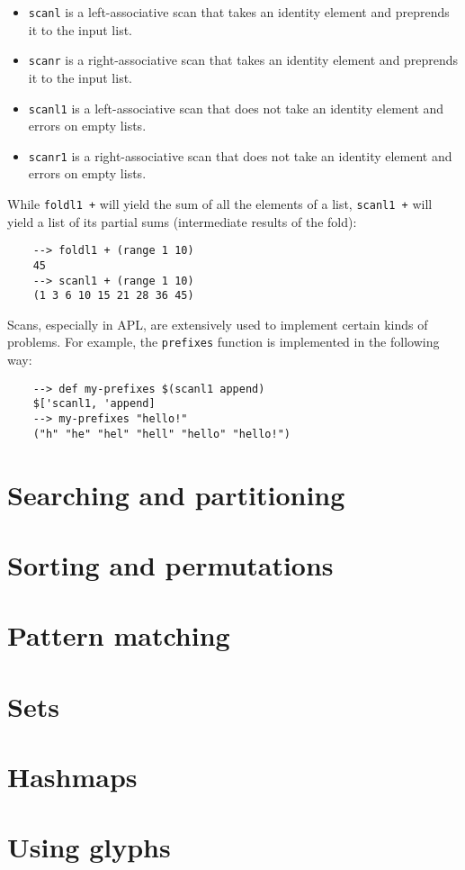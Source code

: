 \begin{itemize}
    \item \verb|scanl| is a left-associative scan that takes an identity element and preprends it to the input list.
    \item \verb|scanr| is a right-associative scan that takes an identity element and preprends it to the input list.
    \item \verb|scanl1| is a left-associative scan that does not take an identity element and errors on empty lists.
    \item \verb|scanr1| is a right-associative scan that does not take an identity element and errors on empty lists.
\end{itemize}

While \verb|foldl1 +| will yield the sum of all the elements of a list, \verb|scanl1 +| will yield a list of its partial sums (intermediate results of the fold):

\begin{Verbatim}
    --> foldl1 + (range 1 10)
    45
    --> scanl1 + (range 1 10)
    (1 3 6 10 15 21 28 36 45)
\end{Verbatim}

Scans, especially in APL, are extensively used to implement certain kinds of problems. For example, the \verb|prefixes| function is implemented in the following way:

\begin{Verbatim}
    --> def my-prefixes $(scanl1 append)
    $['scanl1, 'append]
    --> my-prefixes "hello!"
    ("h" "he" "hel" "hell" "hello" "hello!")
\end{Verbatim}

\section{Searching and partitioning}

\section{Sorting and permutations}

\section{Pattern matching}

\section{Sets}

\section{Hashmaps}

\section{Using glyphs}
